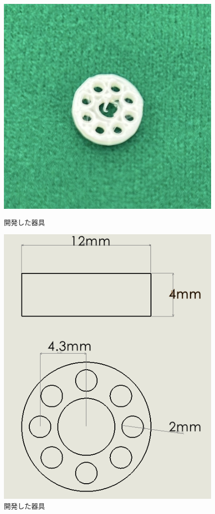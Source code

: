 \begin{figure}[h]
\begin{minipage}[b]{0.33\hsize}
      \centering
      \includegraphics[scale=0.25]{pic/kigu2.jpg}
      \caption{開発した器具}
      \label{fig:11}
  \end{minipage} 
  \begin{minipage}[b]{0.33\hsize}
      \centering
      \includegraphics[scale=0.4]{pic/5mm.PNG}
      \caption{開発した器具}
      \label{fig:12}
  \end{minipage} 
\end{figure}
\newpage
